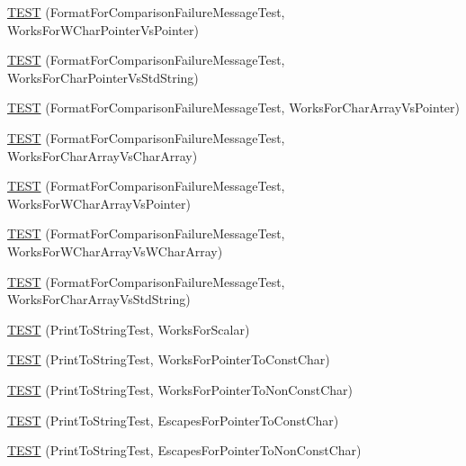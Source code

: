 \begin{DoxyCompactItemize}
\hyperlink{namespacetesting_1_1gtest__printers__test_a735171f4ba0a9dffee9c4c7321107822}{T\+E\+S\+T} (Format\+For\+Comparison\+Failure\+Message\+Test, Works\+For\+W\+Char\+Pointer\+Vs\+Pointer)
\item 
\hyperlink{namespacetesting_1_1gtest__printers__test_ab5a910170489276c14b817b70d4feb96}{T\+E\+S\+T} (Format\+For\+Comparison\+Failure\+Message\+Test, Works\+For\+Char\+Pointer\+Vs\+Std\+String)
\item 
\hyperlink{namespacetesting_1_1gtest__printers__test_ac25834e0463cf9f3d231db24e7b220e5}{T\+E\+S\+T} (Format\+For\+Comparison\+Failure\+Message\+Test, Works\+For\+Char\+Array\+Vs\+Pointer)
\item 
\hyperlink{namespacetesting_1_1gtest__printers__test_aba32640344f0186de5fbb6bb47e0c5a5}{T\+E\+S\+T} (Format\+For\+Comparison\+Failure\+Message\+Test, Works\+For\+Char\+Array\+Vs\+Char\+Array)
\item 
\hyperlink{namespacetesting_1_1gtest__printers__test_a1e95289500400eff5fdcd45c5864a6d2}{T\+E\+S\+T} (Format\+For\+Comparison\+Failure\+Message\+Test, Works\+For\+W\+Char\+Array\+Vs\+Pointer)
\item 
\hyperlink{namespacetesting_1_1gtest__printers__test_af4b502fb5745d2ee0bfb81d1c8eb95f6}{T\+E\+S\+T} (Format\+For\+Comparison\+Failure\+Message\+Test, Works\+For\+W\+Char\+Array\+Vs\+W\+Char\+Array)
\item 
\hyperlink{namespacetesting_1_1gtest__printers__test_ac2300073f401f783ff7b1ef97d2cbd6d}{T\+E\+S\+T} (Format\+For\+Comparison\+Failure\+Message\+Test, Works\+For\+Char\+Array\+Vs\+Std\+String)
\item 
\hyperlink{namespacetesting_1_1gtest__printers__test_a5d1bc4b12c18ccaec2ced9f45c092567}{T\+E\+S\+T} (Print\+To\+String\+Test, Works\+For\+Scalar)
\item 
\hyperlink{namespacetesting_1_1gtest__printers__test_a68100148758516ebab9c761ca7778586}{T\+E\+S\+T} (Print\+To\+String\+Test, Works\+For\+Pointer\+To\+Const\+Char)
\item 
\hyperlink{namespacetesting_1_1gtest__printers__test_a1db34d8760c17157572ce2877007d15a}{T\+E\+S\+T} (Print\+To\+String\+Test, Works\+For\+Pointer\+To\+Non\+Const\+Char)
\item 
\hyperlink{namespacetesting_1_1gtest__printers__test_ab8fce4287e837cfcd851ded56b62f9ce}{T\+E\+S\+T} (Print\+To\+String\+Test, Escapes\+For\+Pointer\+To\+Const\+Char)
\item 
\hyperlink{namespacetesting_1_1gtest__printers__test_a7203081ef422f0835643d2c54b8ebf28}{T\+E\+S\+T} (Print\+To\+String\+Test, Escapes\+For\+Pointer\+To\+Non\+Const\+Char)

\end{DoxyCompactItemize}
